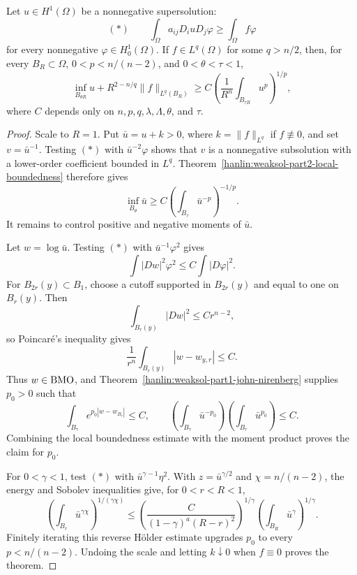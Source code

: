 \begin{theorem}\label{hanlin:weaksol-part2-weak-harnack}
Let $u\in H^1(\Omega)$ be a nonnegative supersolution:
\[
(*)\qquad
\int_\Omega a_{ij}D_i uD_j\varphi
\geq\int_\Omega f\varphi
\]
for every nonnegative $\varphi\in H^1_0(\Omega)$. If
$f\in L^q(\Omega)$ for some $q>n/2$, then, for every
$B_R\subset\Omega$, $0<p<n/(n-2)$, and $0<\theta<\tau<1$,
\[
\inf_{B_{\theta R}}u+R^{2-n/q}\|f\|_{L^q(B_R)}
\geq C\left(\frac1{R^n}\int_{B_{\tau R}}u^p\right)^{1/p},
\]
where $C$ depends only on $n,p,q,\lambda,\Lambda,\theta$, and $\tau$.
\end{theorem}
\begin{proof}
\sketch Scale to $R=1$. Put $\bar u=u+k>0$, where
$k=\|f\|_{L^q}$ if $f\not\equiv0$, and set $v=\bar u^{-1}$. Testing $(*)$
with $\bar u^{-2}\varphi$ shows that $v$ is a nonnegative subsolution with
a lower-order coefficient bounded in $L^q$.
Theorem~\ref{hanlin:weaksol-part2-local-boundedness} therefore gives
\begin{equation}
\inf_{B_\theta}\bar u
\geq C\left(\int_{B_\tau}\bar u^{-p}\right)^{-1/p}.
\end{equation}
It remains to control positive and negative moments of $\bar u$.

Let $w=\log\bar u$. Testing $(*)$ with $\bar u^{-1}\varphi^2$ gives
\begin{equation}
\int|Dw|^2\varphi^2\leq C\int|D\varphi|^2.
\end{equation}
For $B_{2r}(y)\subset B_1$, choose a cutoff supported in $B_{2r}(y)$ and
equal to one on $B_r(y)$. Then
\[
\int_{B_r(y)}|Dw|^2\leq Cr^{n-2},
\]
so Poincar\'e's inequality gives
\[
\frac1{r^n}\int_{B_r(y)}|w-w_{y,r}|\leq C.
\]
Thus $w\in\mathrm{BMO}$, and
Theorem~\ref{hanlin:weaksol-part1-john-nirenberg} supplies $p_0>0$ such that
\begin{equation}
\int_{B_\tau}e^{p_0|w-w_{B_\tau}|}\leq C,
\qquad
\left(\int_{B_\tau}\bar u^{-p_0}\right)
\left(\int_{B_\tau}\bar u^{p_0}\right)\leq C.
\end{equation}
Combining the local boundedness estimate with the moment product proves the
claim for $p_0$.

For $0<\gamma<1$, test $(*)$ with $\bar u^{\gamma-1}\eta^2$. With
$z=\bar u^{\gamma/2}$ and $\chi=n/(n-2)$, the energy and Sobolev
inequalities give, for $0<r<R<1$,
\begin{equation}
\left(\int_{B_r}\bar u^{\gamma\chi}\right)^{1/(\gamma\chi)}
\leq
\left(\frac{C}{(1-\gamma)^a(R-r)^2}\right)^{1/\gamma}
\left(\int_{B_R}\bar u^\gamma\right)^{1/\gamma}.
\end{equation}
Finitely iterating this reverse H\"older estimate upgrades $p_0$ to every
$p<n/(n-2)$. Undoing the scale and letting $k\downarrow0$ when
$f\equiv0$ proves the theorem.
\end{proof}

